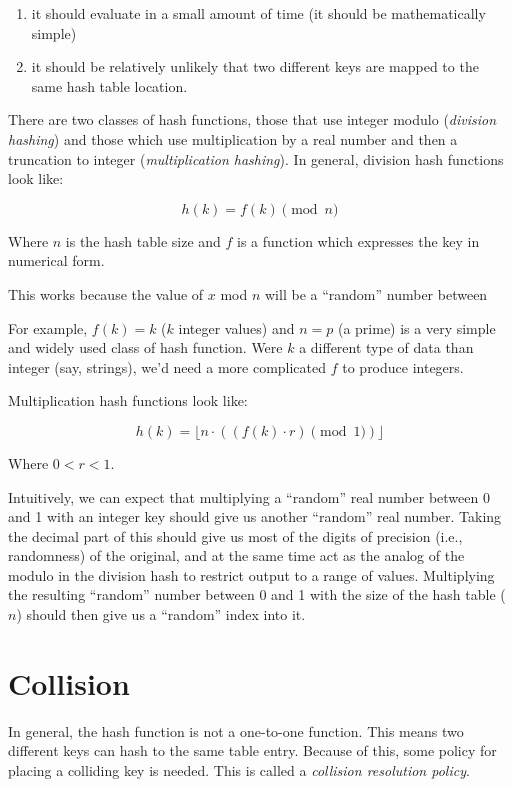\documentclass[12pt]{article}
\newcommand{\floor}[1]{\lfloor #1 \rfloor}
\begin{document}
\begin{enumerate}

\item it should evaluate in a small amount of time (it should be mathematically simple)

\item it should be relatively unlikely that two different keys are mapped to the same hash table location.  

\end{enumerate}

There are two classes of hash functions, those that use integer modulo (\emph{division hashing}) and those which use multiplication by a real number and then a truncation to integer (\emph{multiplication hashing}).  In general, division hash functions look like:

$$ h(k) = f(k) \pmod n $$

Where $n$ is the hash table size and $f$ is a function which expresses the key in numerical form.  

This works because the value of $x$ mod $n$ will be a ``random'' number between 

For example, $f(k)=k$ ($k$ integer values) and $n=p$ (a prime) is a very simple and widely used class of hash function.  Were $k$ a different type of data than integer (say, strings), we'd need a more complicated $f$ to produce integers.

Multiplication hash functions look like:

$$ h(k) = \floor{n \cdot ( (f(k) \cdot r) \pmod 1 )} $$

Where $0 < r < 1$.   

Intuitively, we can expect that multiplying a ``random'' real number between 0 and 1 with an integer key should give us another ``random'' real number.  Taking the decimal part of this should give us most of the digits of precision (i.e., randomness) of the original, and at the same time act as the analog of the modulo in the division hash to restrict output to a range of values.  Multiplying the resulting ``random'' number between 0 and 1 with the size of the hash table ($n$) should then give us a ``random'' index into it.

\section{Collision}

In general, the hash function is not a one-to-one function.  This means two different keys can hash to the same table entry.  Because of this, some policy for placing a colliding key is needed.  This is called a \emph{collision resolution policy}.
\end{document}
